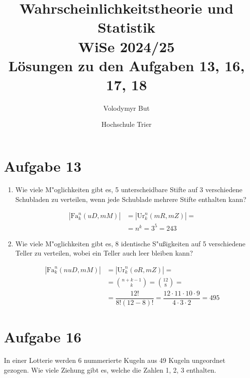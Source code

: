 \documentclass[10pt, oneside]{article}
\title{Wahrscheinlichkeitstheorie und Statistik\\[5pt]\Large WiSe 2024/25\\[10pt]\Large L{\"o}sungen zu den Aufgaben 13, 16, 17, 18}
\author{Volodymyr But}
\date{Hochschule Trier}
\begin{document}
\sloppy

\maketitle
\vspace{25px}

\section{Aufgabe 13}

\begin{enumerate}[1.]
    \item Wie viele M"oglichkeiten gibt es, 5 unterscheidbare Stifte auf 3 verschiedene
        Schubladen zu verteilen, wenn jede Schublade mehrere Stifte enthalten kann?

        \begin{equation*}
            \begin{aligned}
                |\text{Fa}^n_k(uD, mM)| &= |\text{Ur}^n_k(mR, mZ)| = \\[10pt]
                                        &= n^k = 3^5 = 243
            \end{aligned}
        \end{equation*}


    \item Wie viele M"oglichkeiten gibt es, 8 identische S"u{\ss}igkeiten auf 5
        verschiedene Teller zu verteilen, wobei ein Teller auch leer bleiben
        kann?

        \begin{equation*}
            \begin{aligned}
                |\text{Fa}^n_k(nuD, mM)| &= |\text{Ur}^n_k(oR, mZ)| = \\[10pt]
                                         &= \binom{n + k - 1}{k} = \binom{12}{8} = \\[5pt]
                                         &= \dfrac{12!}{8!(12 - 8)!} = \dfrac{12 \cdot 11 \cdot 10 \cdot 9}{4 \cdot 3 \cdot 2} = 495
            \end{aligned}
        \end{equation*}
\end{enumerate}

\section{Aufgabe 16}

In einer Lotterie werden 6 nummerierte Kugeln aus 49 Kugeln ungeordnet gezogen.
Wie viele Ziehung gibt es, welche die Zahlen 1, 2, 3 enthalten.
\end{document}
